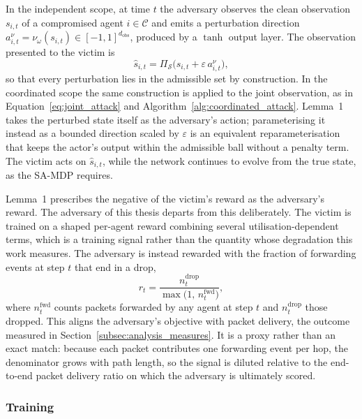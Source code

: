 In the independent scope, at time $t$ the adversary observes the clean observation
$s_{i,t}$ of a compromised agent $i \in \mathcal{C}$ and emits a perturbation direction
$a^{\nu}_{i,t} = \nu_\omega(s_{i,t}) \in [-1,1]^{d_{\text{obs}}}$, produced by a $\tanh$
output layer. The observation presented to the victim is
\begin{equation}
  \hat{s}_{i,t} = \Pi_{\mathcal{S}}\big( s_{i,t} + \varepsilon \, a^{\nu}_{i,t} \big),
  \label{eq:la_perturbation}
\end{equation}
so that every perturbation lies in the admissible set by construction. In the
coordinated scope the same construction is applied to the joint observation, as in
Equation~\eqref{eq:joint_attack} and Algorithm~\ref{alg:coordinated_attack}. Lemma~1
takes the perturbed state itself as the
adversary's action; parameterising it instead as a bounded direction scaled by
$\varepsilon$ is an equivalent reparameterisation that keeps the actor's output within
the admissible ball without a penalty term. The victim acts on $\hat{s}_{i,t}$, while the
network continues to evolve from the true state, as the SA-MDP requires.

Lemma~1 prescribes the negative of the victim's reward as the adversary's reward. The
adversary of this thesis departs from this deliberately. The victim is trained on a
shaped per-agent reward combining several utilisation-dependent terms, which is a
training signal rather than the quantity whose degradation this work measures. The
adversary is instead rewarded with the fraction of forwarding events at step $t$ that
end in a drop,
\begin{equation}
  r_t = \frac{n^{\text{drop}}_t}{\max\big(1,\, n^{\text{fwd}}_t\big)},
  \label{eq:la_reward}
\end{equation}
where $n^{\text{fwd}}_t$ counts packets forwarded by any agent at step $t$ and
$n^{\text{drop}}_t$ those dropped. This aligns the adversary's objective with packet
delivery, the outcome measured in Section~\ref{subsec:analysis_measures}. It is a proxy
rather than an exact match: because each packet contributes one forwarding event per
hop, the denominator grows with path length, so the signal is diluted relative to the
end-to-end packet delivery ratio on which the adversary is ultimately scored.

\subsubsection*{Training}

